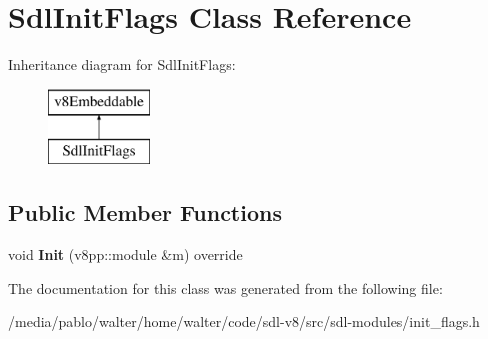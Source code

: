 \hypertarget{classSdlInitFlags}{}\section{Sdl\+Init\+Flags Class Reference}
\label{classSdlInitFlags}
Inheritance diagram for Sdl\+Init\+Flags\+:\begin{figure}[H]
\begin{center}
\leavevmode
\includegraphics[height=2.000000cm]{classSdlInitFlags}
\end{center}
\end{figure}
\subsection*{Public Member Functions}
\begin{DoxyCompactItemize}
\item 
\mbox{\label{classSdlInitFlags_a0c60391800c09bef3effe8b128a9c4e9}} 
void {\bfseries Init} (v8pp\+::module \&m) override
\end{DoxyCompactItemize}


The documentation for this class was generated from the following file\+:\begin{DoxyCompactItemize}
\item 
/media/pablo/walter/home/walter/code/sdl-\/v8/src/sdl-\/modules/init\+\_\+flags.\+h\end{DoxyCompactItemize}
